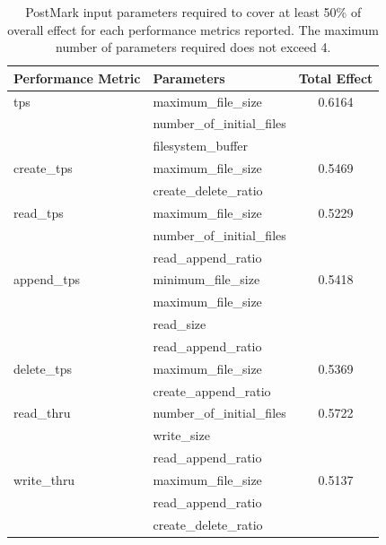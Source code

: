 \begin{table}[!t]
\centering
\begin{tabularx}{0.9\textwidth}{
  l | 
  X 
  c
}
\hline
\bfseries Performance Metric   &\bfseries Parameters           &\bfseries Total Effect  \\
\hline\hline
tps           & maximum\_file\_size                             &0.6164   \\
              & number\_of\_initial\_files                      &         \\
              & filesystem\_buffer                              &         \\
\hline
create\_tps   & maximum\_file\_size                             &0.5469   \\
              & create\_delete\_ratio                           &         \\
\hline
read\_tps     & maximum\_file\_size                             &0.5229   \\
              & number\_of\_initial\_files                      &         \\
              & read\_append\_ratio                             &         \\
\hline
append\_tps   & minimum\_file\_size                             &0.5418   \\
              & maximum\_file\_size                             &         \\
              & read\_size                                      &         \\
              & read\_append\_ratio                             &         \\
\hline
delete\_tps   & maximum\_file\_size                             &0.5369   \\
              & create\_append\_ratio                           &         \\
\hline
read\_thru    & number\_of\_initial\_files                      &0.5722   \\
              & write\_size                                     &         \\
              & read\_append\_ratio                             &         \\
\hline
write\_thru   & maximum\_file\_size                             &0.5137   \\
              & read\_append\_ratio                             &         \\
              & create\_delete\_ratio                           &         \\
\hline
\end{tabularx}
\captionsetup{format=myformat}
\caption{PostMark input parameters required to cover at least 50\% of overall effect for each performance metrics reported.
The maximum number of parameters required does not exceed 4.}
\label{pm_50_t}
\end{table}


